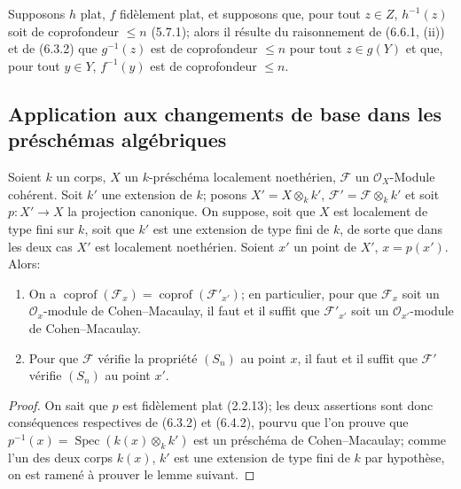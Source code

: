 \begin{remark}[6.6.2]
\label{IV.2.s6.6.2-fr}
Supposons $h$ plat, $f$ fidèlement plat, et supposons que, pour tout
$z\in Z$, $h^{-1}(z)$ soit de coprofondeur $\leqslant n$ (5.7.1); alors
il résulte du raisonnement de (6.6.1, (ii)) et de (6.3.2) que
$g^{-1}(z)$ est de coprofondeur $\leqslant n$ pour tout $z\in g(Y)$ et
que, pour tout $y\in Y$, $f^{-1}(y)$ est de coprofondeur $\leqslant n$.
\end{remark}


\subsection{Application aux changements de base dans les préschémas algébriques}

\begin{proposition}[6.7.1]
\label{IV.2.s6.7.1-fr}
Soient $k$ un corps, $X$ un $k$-préschéma localement noethérien,
$\mathscr F$ un $\mathcal O_X$-Module cohérent. Soit $k'$ une extension
de $k$; posons $X'=X\otimes_k k'$, $\mathscr F'=\mathscr F\otimes_k k'$
et soit $p:X'\to X$ la projection canonique. On suppose, soit que
$X$ est localement de type fini sur $k$, soit que $k'$ est une extension
de type fini de $k$, de sorte que dans les deux cas $X'$ est localement
noethérien. Soient $x'$ un point de $X'$, $x=p(x')$. Alors:
\begin{enumerate}
\item[(i)] On a $\operatorname{coprof}(\mathscr F_x)=
\operatorname{coprof}(\mathscr F'_{x'})$; en particulier, pour que
$\mathscr F_x$ soit un $\mathcal O_x$-module de Cohen--Macaulay, il
faut et il suffit que $\mathscr F'_{x'}$ soit un
$\mathcal O_{x'}$-module de Cohen--Macaulay.
\item[(ii)] Pour que $\mathscr F$ vérifie la propriété $(S_n)$ au point
$x$, il faut et il suffit que $\mathscr F'$ vérifie $(S_n)$ au point
$x'$.
\end{enumerate}
\end{proposition}

\begin{proof}
On sait que $p$ est fidèlement plat (2.2.13); les deux assertions sont
donc conséquences respectives de (6.3.2) et (6.4.2), pourvu que l'on
prouve que $p^{-1}(x)=\operatorname{Spec}(k(x)\otimes_k k')$ est un
préschéma de Cohen--Macaulay; comme l'un des deux corps $k(x)$, $k'$ est
une extension de type fini de $k$ par hypothèse, on est ramené à prouver
le lemme suivant.
\end{proof}


